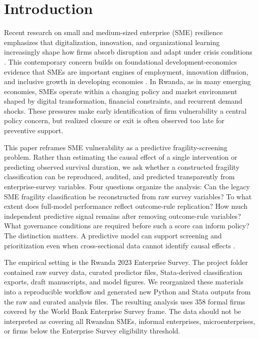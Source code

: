 \section{Introduction}

Recent research on small and medium-sized enterprise (SME) resilience emphasizes that digitalization, innovation, and organizational learning increasingly shape how firms absorb disruption and adapt under crisis conditions \citep{sagala2024antifragility, sinha2025digitalisation}. This contemporary concern builds on foundational development-economics evidence that SMEs are important engines of employment, innovation diffusion, and inclusive growth in developing economies \citep{beck2006small, ayyagari2007small}. In Rwanda, as in many emerging economies, SMEs operate within a changing policy and market environment shaped by digital transformation, financial constraints, and recurrent demand shocks. These pressures make early identification of firm vulnerability a central policy concern, but realized closure or exit is often observed too late for preventive support.

This paper reframes SME vulnerability as a predictive fragility-screening problem. Rather than estimating the causal effect of a single intervention or predicting observed survival duration, we ask whether a constructed fragility classification can be reproduced, audited, and predicted transparently from enterprise-survey variables. Four questions organize the analysis: Can the legacy SME fragility classification be reconstructed from raw survey variables? To what extent does full-model performance reflect outcome-rule replication? How much independent predictive signal remains after removing outcome-rule variables? What governance conditions are required before such a score can inform policy? The distinction matters. A predictive model can support screening and prioritization even when cross-sectional data cannot identify causal effects \citep{shmueli2010explain}.

The empirical setting is the Rwanda 2023 Enterprise Survey. The project folder contained raw survey data, curated predictor files, Stata-derived classification exports, draft manuscripts, and model figures. We reorganized these materials into a reproducible workflow and generated new Python and Stata outputs from the raw and curated analysis files. The resulting analysis uses 358 formal firms covered by the World Bank Enterprise Survey frame. The data should not be interpreted as covering all Rwandan SMEs, informal enterprises, microenterprises, or firms below the Enterprise Survey eligibility threshold.

